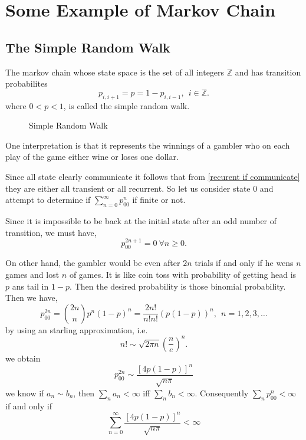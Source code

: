 \chapter{Some Example of Markov Chain}
\section{The Simple Random Walk}
The markov chain whose state space is the set of all integers $ \mathds{Z} $ and has transition probabilites
\[
    p_{i,i+1} = p = 1-p_{i,i-1}, \ \ i\in\mathds{Z}.
\]
where $ 0<p<1 $, is called the simple random walk.

\begin{figure}[h]
    \centering
    \caption{Simple Random Walk}
    \label{Simple random walk}
\end{figure}

One interpretation is that it represents the winnings of a gambler who on each play of the game either wine or loses one dollar.

Since all state clearly communicate it follows that from \cref{recurent if communicate} they are either all transient or all recurrent. 
So let us consider state 0 and
attempt to determine if  $ \sum_{n=0}^{\infty} p_{00}^{n} $ if finite or not.

Since it is impossible to be back at the initial state after an odd number of transition, we must have,
\[
    p^{2n+1}_{00} = 0 \ \forall n\ge 0.
\]

On other hand, the gambler would be even after $ 2n $ trials if and only if he wens  $ n $ games and lost  $ n $ of games.
It is like coin toss with probability of getting head is $ p $ ans tail in  $ 1-p $. Then the desired probability is those binomial probability.
Then we have,
 \[
     p^{2n}_{00} = \binom{2n}{n}p^{n}(1-p)^{n} = \frac{2n!}{n!n!}(p(1-p))^{n}, \ \ n=1,2,3,\ldots
\]
by using an starling approximation,
i.e.
\[
    n! \sim \sqrt{2\pi n}\left(\frac{n}{e}\right)^{n}.
\]
we obtain 
\[
    p^{2n}_{00}\sim \frac{[4p(1-p)]^{n}}{\sqrt{n\pi}}
\]
we know if $ a_{n}\sim b_{n} $, then $ \sum_{n}a_{n}<\infty  $ iff $ \sum_{n}b_{n}<\infty  $. Consequently $ \sum_{n}p^{n}_{00}<\infty  $ 
if and only if
\[
    \sum_{n=0}^{\infty} \frac{[4p(1-p)]^{n}}{\sqrt{n\pi}} < \infty
\]

